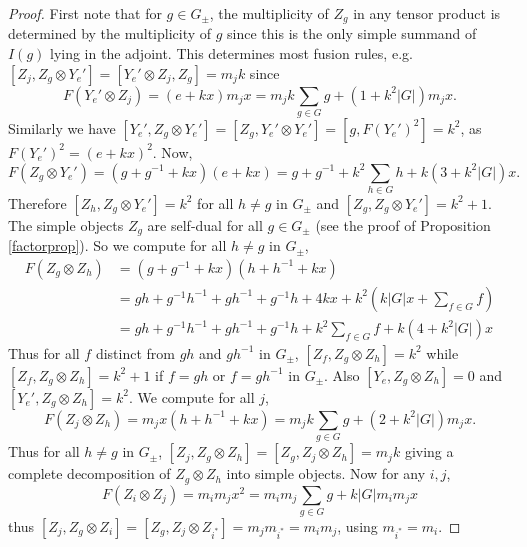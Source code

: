 \documentclass[10pt]{article}
\theoremstyle{plain}
\theoremstyle{definition}
\theoremstyle{plain}
\begin{document}
\begin{proof}
First note that for $g\in G_{\pm}$, the multiplicity of $Z_g$ in any tensor product is determined by the multiplicity of $g$ since this is the only simple summand of $I(g)$ lying in the adjoint.  This determines most fusion rules, e.g. $[Z_j,Z_g\otimes Y_e']=[Y_e'\otimes Z_j,Z_g]=m_jk$ since
\begin{equation}
F(Y_e'\otimes Z_j)=(e+kx)m_jx=m_jk\sum_{g\in G}g+(1+k^2|G|)m_jx.    
\end{equation}
Similarly we have $[Y_e',Z_g\otimes Y_e']=[Z_g,Y_e'\otimes Y_e']=[g,F(Y_e')^2]=k^2$, as $F(Y_e')^2=(e+kx)^2$.  Now,
\begin{equation}
F(Z_g\otimes Y_e')=(g+g^{-1}+kx)(e+kx)=g+g^{-1}+k^2\sum_{h\in G}h+k(3+k^2|G|)x.
\end{equation}
Therefore $[Z_h,Z_g\otimes Y_e']=k^2$ for all $h\neq g$ in $G_{\pm}$ and $[Z_g,Z_g\otimes Y_e']=k^2+1$.  The simple objects $Z_g$ are self-dual for all $g\in G_{\pm}$ (see the proof of Proposition \ref{factorprop}). So we compute for all $h\neq g$ in $G_{\pm}$,
\begin{align}
F(Z_g\otimes Z_h)&=(g+g^{-1}+kx)(h+h^{-1}+kx) \\
&=gh+g^{-1}h^{-1}+gh^{-1}+g^{-1}h+4kx+ k^2\left(k|G|x+\sum_{f\in G}f\right) \\
&=gh+ g^{-1}h^{-1}+ gh^{-1}+ g^{-1}h+k^2\sum_{f\in G}f+k(4+k^2|G|)x
\end{align}
Thus for all $f$ distinct from $gh$ and $gh^{-1}$ in $G_{\pm}$, $[Z_f,Z_g\otimes Z_h]=k^2$ while $[Z_f,Z_g\otimes Z_h]=k^2+1$ if $f=gh$ or $f=gh^{-1}$ in $G_{\pm}$.  Also $[Y_e,Z_g\otimes Z_h]=0$ and $[Y_e',Z_g\otimes Z_h]=k^2$.  We compute for all $j$,
\begin{equation}
F(Z_j\otimes Z_h)=m_jx(h+ h^{-1}+kx)=m_jk\sum_{g\in G}g+(2+k^2|G|)m_jx.
\end{equation}
Thus for all $h\neq g$ in $G_{\pm}$, $[Z_j,Z_g\otimes Z_h]=[Z_g,Z_j\otimes Z_h]=m_jk$ giving a complete decomposition of $Z_g\otimes Z_h$ into simple objects.  Now for any $i,j$,
\begin{equation}
F(Z_i\otimes Z_j)=m_im_jx^2=m_im_j\sum_{g\in G}g+k|G|m_im_jx
\end{equation}
thus $[Z_j,Z_g\otimes Z_i]=[Z_g,Z_j\otimes Z_{i^\ast}]=m_jm_{i^\ast}=m_im_j$, using $m_{i^\ast}=m_i$.
\end{proof}
\end{document}
